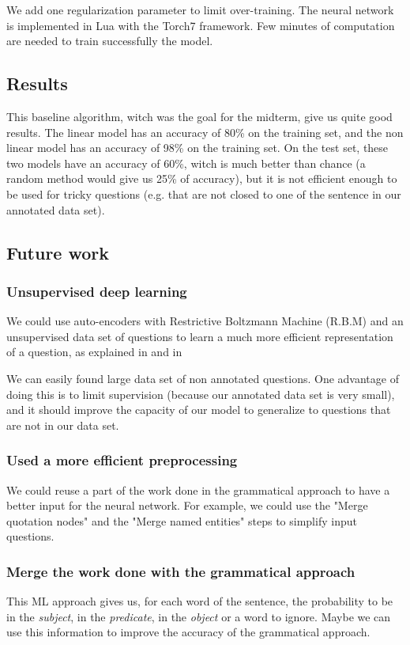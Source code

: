 We add one regularization parameter to limit over-training.
The neural network is implemented in Lua with the Torch7 framework.
Few minutes of computation are needed to train successfully the model.

\subsection{Results}

This baseline algorithm, witch was the goal for the midterm, give us quite good results.
The linear model has an accuracy of 80\% on the training set, and the non linear model has an accuracy of 98\% on the training set.
On the test set, these two models have an accuracy of 60\%, witch is much better than chance (a random method would give us 25\% of accuracy), but it is not efficient enough to be used for tricky questions (e.g. that are not closed to one of the sentence in our annotated data set).

\subsection{Future work}

\subsubsection{Unsupervised deep learning}

We could use auto-encoders  with Restrictive Boltzmann Machine (R.B.M) and an unsupervised data set of questions to learn a much more efficient representation of a question, as explained in \cite{fischer2012introduction} and in \cite{hinton2006reducing}

We can easily found large data set of non annotated questions.
One advantage of doing this is to limit supervision (because our annotated data set is very small), and it should improve the capacity of our model to generalize to questions that are not in our data set.

\subsubsection{Used a more efficient preprocessing}

We could reuse a part of the work done in the grammatical approach to have a better input for the neural network. For example, we could use the "Merge quotation nodes" and the "Merge named entities" steps to simplify input questions.

\subsubsection{Merge the work done with the grammatical approach}

This ML approach gives us, for each word of the sentence, the probability to be in the \textit{subject}, in the \textit{predicate}, in the \textit{object} or a word to ignore.
Maybe we can use this information to improve the accuracy of the grammatical approach.



